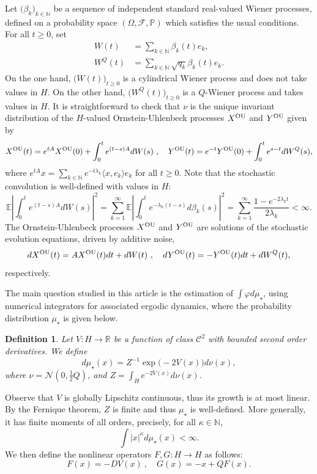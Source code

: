 \documentclass[11pt]{amsart}
\newcommand{\E}{\mathbb{E}}
\newcommand{\R}{\mathbb{R}}
\newcommand{\N}{\mathbb{N}}
\newtheorem{defi}[theo]{Definition}
\begin{document}
Let $\bigl(\beta_k\bigr)_{k\in\N}$ be a sequence of independent standard real-valued Wiener processes, defined on a probability space $(\Omega,\mathcal{F},\mathbb{P})$ which satisfies the usual conditions. For all $t\ge 0$, set
\begin{align*}
W(t)&=\sum_{k\in\N}\beta_k(t)e_k,\\
W^Q(t)&=\sum_{k\in\N}\sqrt{q_k}\beta_k(t)e_k.
\end{align*}
On the one hand, $\bigl(W(t)\bigr)_{t\ge 0}$ is a cylindrical Wiener process and does not take values in $H$. On the other hand, $\bigl(W^Q(t)\bigr)_{t\ge 0}$ is a $Q$-Wiener process and takes values in $H$.
%
It is straightforward to check that $\nu$ is the unique invariant distribution of the $H$-valued Ornstein-Uhlenbeck processes $X^{\rm OU}$ and $Y^{\rm OU}$ given by
\[
X^{\rm OU}(t)=e^{tA}X^{\rm OU}(0)+\int_{0}^{t}e^{(t-s)A}dW(s)~,\quad Y^{\rm OU}(t)=e^{-t}Y^{\rm OU}(0)+\int_{0}^{t}e^{s-t}dW^Q(s),
\]
where $e^{tA}x=\sum_{k\in\N}e^{-t\lambda_k}\langle x,e_k\rangle e_k$ for all $t\ge 0$. Note that the stochastic convolution is well-defined with values in $H$:
\[
\E|\int_{0}^{t}e^{(t-s)A}dW(s)|^2=\sum_{k=1}^{\infty}\E|\int_{0}^te^{-\lambda_k(t-s)}d\beta_k(s)|^2=\sum_{k=1}^{\infty}\frac{1-e^{-2\lambda_kt}}{2\lambda_k}<\infty.
\]
The Ornstein-Uhlenbeck processes $X^{\rm OU}$ and $Y^{\rm OU}$ are solutions of the stochastic evolution equations, driven by additive noise,
\[
dX^{\rm OU}(t)=AX^{\rm OU}(t)dt+dW(t)~,\quad dY^{\rm OU}(t)=-Y^{\rm OU}(t)dt+dW^Q(t),
\]
respectively.



The main question studied in this article is the estimation of $\int \varphi d\mu_\star$, using numerical integrators for associated ergodic dynamics, where the probability distribution $\mu_\star$ is given below.
\begin{defi}\label{defi:mu}
Let $V:H\to\R$ be a function of class $\mathcal{C}^2$ with bounded second order derivatives.
We define
\[
d\mu_\star(x)=Z^{-1}\exp\bigl(-2V(x)\bigr)d\nu(x),
\]
where $\nu=\mathcal{N}(0,\frac12 Q)$, and $Z=\int_{H}e^{-2V(x)}d\nu(x)$.
\end{defi}

Observe that $V$ is globally Lipschitz continuous, thus its growth is at most linear. By the Fernique theorem, $Z$ is finite and thus $\mu_\star$ is well-defined. More generally, it has finite moments of all orders, precisely, for all $\kappa\in\N$,
\[
\int |x|^\kappa d\mu_\star(x)<\infty.
\]
We then define the nonlinear operators $F,G:H\to H$ as follows:
\[
F(x)=-DV(x)~,\quad G(x)=-x+QF(x).
\]
\end{document}
